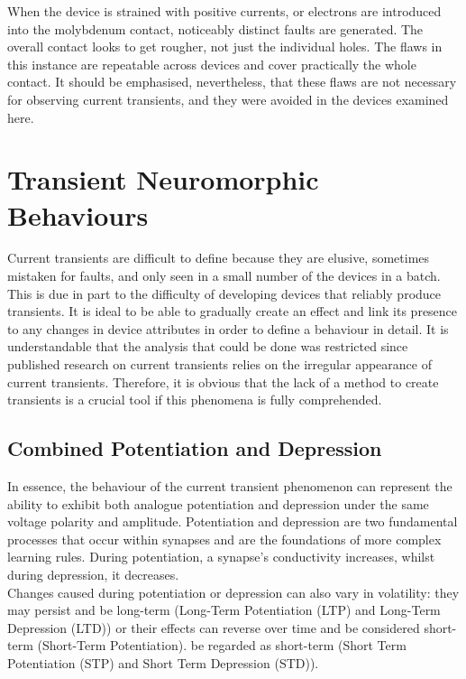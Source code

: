 \noindent When the device is strained with positive currents, or electrons are introduced into the molybdenum contact, noticeably distinct faults are generated. The overall contact looks to get rougher, not just the individual holes. The flaws in this instance are repeatable across devices and cover practically the whole contact. It should be emphasised, nevertheless, that these flaws are not necessary for observing current transients, and they were avoided in the devices examined here.

\section[Transient Neuromorphic Behaviours]{Transient Neuromorphic Behaviours}

Current transients are difficult to define because they are elusive, sometimes mistaken for faults, and only seen in a small number of the devices in a batch. This is due in part to the difficulty of developing devices that reliably produce transients. It is ideal to be able to gradually create an effect and link its presence to any changes in device attributes in order to define a behaviour in detail. It is understandable that the analysis that could be done was restricted since published research on current transients relies on the irregular appearance of current transients. Therefore, it is obvious that the lack of a method to create transients is a crucial tool if this phenomena is fully comprehended.

\subsection[Combined Potentiation and Depression]{Combined Potentiation and Depression}

In essence, the behaviour of the current transient phenomenon can represent the ability to exhibit both analogue potentiation and depression under the same voltage polarity and amplitude. Potentiation and depression are two fundamental processes that occur within synapses and are the foundations of more complex learning rules. During potentiation, a synapse's conductivity increases, whilst during depression, it decreases. \\

\noindent Changes caused during potentiation or depression can also vary in volatility: they may persist and be long-term (Long-Term Potentiation (LTP) and Long-Term Depression (LTD)) or their effects can reverse over time and be considered short-term (Short-Term Potentiation). be regarded as short-term (Short Term Potentiation (STP) and Short Term Depression (STD)).\\

